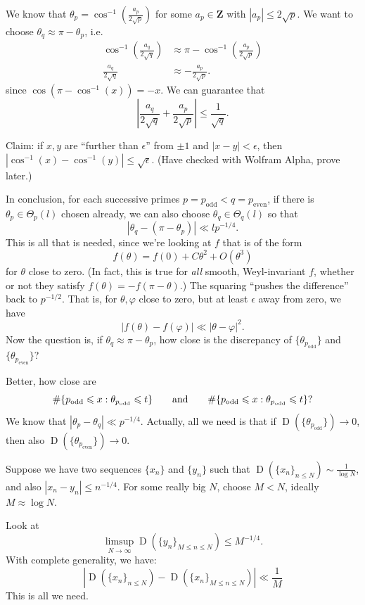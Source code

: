 \documentclass{article}
\DeclareMathOperator{\disc}{D}
\newcommand{\bZ}{\mathbf{Z}}
\newcommand{\even}{\mathrm{even}}
\newcommand{\odd}{\mathrm{odd}}
\begin{document}
We know that $\theta_p = \cos^{-1}\left(\frac{a_p}{2\sqrt p}\right)$ for 
some $a_p\in \bZ$ with $|a_p| \leqslant 2\sqrt p$. We want to choose 
$\theta_q\approx \pi-\theta_p$, i.e.~
\begin{align*}
	\cos^{-1}\left(\frac{a_q}{2\sqrt q}\right) 
		&\approx \pi - \cos^{-1}\left(\frac{a_p}{2\sqrt p}\right) \\
	\frac{a_q}{2\sqrt q} 
		&\approx -\frac{a_p}{2\sqrt p} .
\end{align*}
since $\cos(\pi - \cos^{-1}(x)) = - x$. We can guarantee that 
\[
	\left|\frac{a_q}{2\sqrt q} + \frac{a_p}{2\sqrt p}\right| \leqslant \frac{1}{\sqrt q} .
\]

Claim: if $x,y$ are ``further than $\epsilon$'' from $\pm 1$ and 
$|x-y|<\epsilon$, then 
$|\cos^{-1}(x) - \cos^{-1}(y)| \leqslant \sqrt \epsilon$. 
(Have checked with Wolfram Alpha, prove later.)

In conclusion, for each successive primes $p=p_\odd < q=p_\even$, if there 
is $\theta_p\in \Theta_p(l)$ chosen already, we can also choose 
$\theta_q\in \Theta_q(l)$ so that 
\[
	|\theta_q - (\pi - \theta_p)| \ll l p^{-1/4} .
\]
This is all that is needed, since we're looking at $f$ that is of the form 
\[
	f(\theta) = f(0) + C \theta^2 + O(\theta^3)
\]
for $\theta$ close to zero. (In fact, this is true for \emph{all} smooth, 
Weyl-invariant $f$, whether or not they satisfy $f(\theta) = -f(\pi-\theta)$.)
The squaring ``pushes the difference'' back to 
$p^{-1/2}$. That is, for $\theta,\varphi$ close to zero, but at least 
$\epsilon$ away from zero, we have 
\[
	|f(\theta) - f(\varphi)| \ll |\theta-\varphi|^2 .
\]
Now the question is, if $\theta_q \approx \pi - \theta_p$, how close is the 
discrepancy of $\{\theta_{p_\odd}\}$ and $\{\theta_{p_\even}\}$?

Better, how close are 
\[
	\# \{p_\odd \leqslant x : \theta_{p_\odd} \leqslant t\} \qquad \textnormal{and}\qquad \# \{p_\odd \leqslant x : \theta_{p_\odd} \leqslant t\} ?
\]
We know that $|\theta_p - \theta_q| \ll p^{-1/4}$. Actually, all we need is 
that if $\disc(\{\theta_{p_\odd}\}) \to 0$, then also 
$\disc(\{\theta_{p_\even}\}) \to 0$. 

Suppose we have two sequences $\{x_n\}$ and $\{y_n\}$ such that  
$\disc(\{x_n\}_{n\leqslant N}) \sim \frac{1}{\log N}$, and also 
$|x_n - y_n| \leqslant n^{-1/4}$. For some really big $N$, choose 
$M<N$, ideally $M\approx \log N$. 

Look at 
\[
	\limsup_{N\to \infty} \disc(\{y_n\}_{M\leqslant n \leqslant N}) \leqslant M^{-1/4} .
\]
With complete generality, we have:
\[
	\left|\disc(\{x_n\}_{n\leqslant N}) - \disc(\{x_n\}_{M\leqslant n\leqslant N})\right| \ll \frac{1}{M}
\]
This is all we need.
\end{document}
